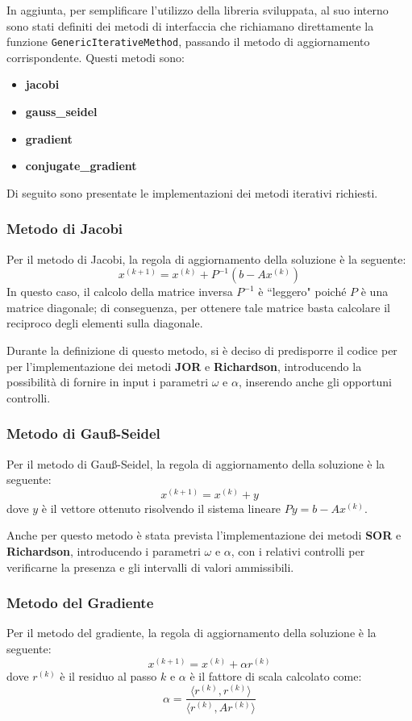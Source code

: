 In aggiunta, per semplificare l'utilizzo della libreria sviluppata, al suo interno
sono stati definiti dei metodi di interfaccia che richiamano direttamente la
funzione \texttt{GenericIterativeMethod}, passando il metodo di aggiornamento
corrispondente. Questi metodi sono:
\begin{itemize}
    \item \textbf{jacobi}
    \item \textbf{gauss\_seidel}
    \item \textbf{gradient}
    \item \textbf{conjugate\_gradient}
\end{itemize}

Di seguito sono presentate le implementazioni dei metodi iterativi richiesti.
\subsubsection{Metodo di Jacobi}
Per il metodo di Jacobi, la regola di aggiornamento della soluzione è la seguente:
\begin{equation}
    x^{(k+1)} = x^{(k)} + P^{-1}(b - Ax^{(k)})
\end{equation}
In questo caso, il calcolo della matrice inversa $P^{-1}$ è ``leggero" poiché $P$
è una matrice diagonale; di conseguenza, per ottenere tale matrice basta calcolare
il reciproco degli elementi sulla diagonale.

Durante la definizione di questo metodo, si è deciso di predisporre il codice per
per l'implementazione dei metodi \textbf{JOR} e \textbf{Richardson}, introducendo
la possibilità di fornire in input i parametri $\omega$ e $\alpha$, inserendo anche
gli opportuni controlli.
\subsubsection{Metodo di Gauß-Seidel}
Per il metodo di Gauß-Seidel, la regola di aggiornamento della soluzione è la seguente:
\begin{equation}
    x^{(k+1)} = x^{(k)} + y
\end{equation}
dove $y$ è il vettore ottenuto risolvendo il sistema lineare $Py = b - Ax^{(k)}$.

Anche per questo metodo è stata prevista l'implementazione dei metodi \textbf{SOR}
e \textbf{Richardson}, introducendo i parametri $\omega$ e $\alpha$, con i relativi
controlli per verificarne la presenza e gli intervalli di valori ammissibili.

\subsubsection{Metodo del Gradiente}
Per il metodo del gradiente, la regola di aggiornamento della soluzione è la seguente:
\begin{equation}
    x^{(k+1)} = x^{(k)} + \alpha r^{(k)}
\end{equation}
dove $r^{(k)}$ è il residuo al passo $k$ e $\alpha$ è il fattore di scala calcolato
come:
\begin{equation}
    \alpha = \frac{\langle r^{(k)}, r^{(k)}\rangle}{\langle r^{(k)}, Ar^{(k)}\rangle}
\end{equation}

